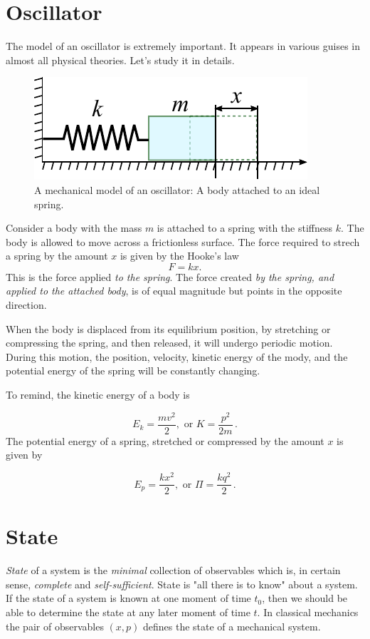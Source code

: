 \section{Oscillator}\label{sec:Oscillator}
The model of an oscillator is extremely important. It appears in
various guises in almost all physical theories. Let's study it in details.

\begin{figure}[htbp]
	\centering
	\includegraphics[scale=0.9]{Oscillator}
	\caption{A mechanical model of an oscillator: A body attached to an
		ideal spring.}
	\label{fig:Oscillator}
\end{figure}


Consider a body with the mass $m$ is attached to a spring with the stiffness
$k$. The body is allowed to move across a frictionless
surface.  The force required to strech a spring by the amount $x$
is given by the Hooke's law
\[
F=kx.
\]
This is the force applied \emph{to the spring}. The force created
\emph{by the spring, and applied to the attached body}, is of equal
magnitude but points in the opposite direction.

When the body is displaced from its equilibrium position,
by stretching or compressing the spring, and then released, it will
undergo periodic motion. During this motion, the position, velocity,
kinetic energy of the mody, and the potential energy of the spring
will be constantly changing.

To remind, the kinetic energy of a body is

\[
E_{k}=\frac{mv^{2}}{2}, \textrm{ or } K = \frac{p^2}{2m}\,.
\]
The potential energy of a spring, stretched or compressed by the
amount $x$ is given by

\[
E_{p}=\frac{kx^{2}}{2}, \textrm{ or } \Pi = \frac{kq^2}{2}\,.
\]


\section{State}\label{sec:State}
\emph{State} of a system is the \emph{minimal} collection of observables which is, in
certain sense, \emph{complete} and \emph{self-sufficient}. State is 
"all there is to know" about a system. If the state of a system is known at one
moment of time $t_0$, then we should be able to determine the state
at any later moment of time $t$. In classical mechanics the pair of
observables $(x, p)$ defines the state of a mechanical system.

